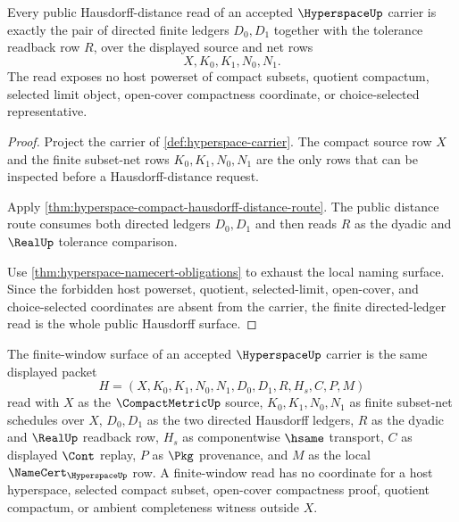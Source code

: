 \begin{theorem}
\label{thm:hyperspace-finite-hausdorff-carrier}
Every public Hausdorff-distance read of an accepted $\HyperspaceUp$ carrier is exactly the pair of directed finite ledgers $D_0,D_1$ together with the tolerance readback row $R$, over the displayed source and net rows
$$
X,K_0,K_1,N_0,N_1 .
$$
The read exposes no host powerset of compact subsets, quotient compactum, selected limit object, open-cover compactness coordinate, or choice-selected representative.
\end{theorem}
\begin{proof}
Project the carrier of \autoref{def:hyperspace-carrier}. The compact source row $X$ and the finite subset-net rows $K_0,K_1,N_0,N_1$ are the only rows that can be inspected before a Hausdorff-distance request.

Apply \autoref{thm:hyperspace-compact-hausdorff-distance-route}. The public distance route consumes both directed ledgers $D_0,D_1$ and then reads $R$ as the dyadic and $\RealUp$ tolerance comparison.

Use \autoref{thm:hyperspace-namecert-obligations} to exhaust the local naming surface. Since the forbidden host powerset, quotient, selected-limit, open-cover, and choice-selected coordinates are absent from the carrier, the finite directed-ledger read is the whole public Hausdorff surface.
\end{proof}



\begin{definition}
\label{def:hyperspace-finite-window-carrier}
The finite-window surface of an accepted $\HyperspaceUp$ carrier is the same displayed packet
$$
H=(X,K_0,K_1,N_0,N_1,D_0,D_1,R,H_s,C,P,M)
$$
read with $X$ as the $\CompactMetricUp$ source, $K_0,K_1,N_0,N_1$ as finite subset-net schedules over $X$, $D_0,D_1$ as the two directed Hausdorff ledgers, $R$ as the dyadic and $\RealUp$ readback row, $H_s$ as componentwise $\hsame$ transport, $C$ as displayed $\Cont$ replay, $P$ as $\Pkg$ provenance, and $M$ as the local $\NameCert_{\HyperspaceUp}$ row. A finite-window read has no coordinate for a host hyperspace, selected compact subset, open-cover compactness proof, quotient compactum, or ambient completeness witness outside $X$.
\end{definition}

